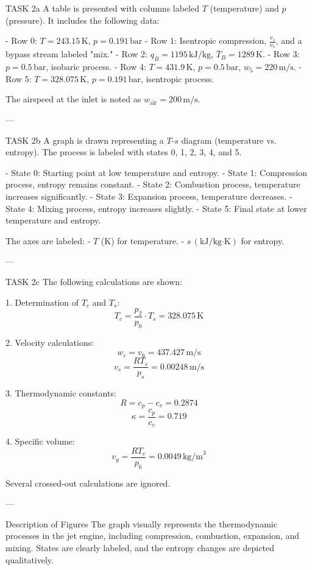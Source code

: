 TASK 2a  
A table is presented with columns labeled \( T \) (temperature) and \( p \) (pressure). It includes the following data:  

- Row 0: \( T = 243.15 \, \text{K} \), \( p = 0.191 \, \text{bar} \)  
- Row 1: Isentropic compression, \( \frac{v_1}{v_5} \), and a bypass stream labeled "mix."  
- Row 2: \( q_B = 1195 \, \text{kJ/kg} \), \( \bar{T}_B = 1289 \, \text{K} \).  
- Row 3: \( p = 0.5 \, \text{bar} \), isobaric process.  
- Row 4: \( T = 431.9 \, \text{K} \), \( p = 0.5 \, \text{bar} \), \( w_5 = 220 \, \text{m/s} \).  
- Row 5: \( T = 328.075 \, \text{K} \), \( p = 0.191 \, \text{bar} \), isentropic process.  

The airspeed at the inlet is noted as \( w_{\text{air}} = 200 \, \text{m/s} \).  

---

TASK 2b  
A graph is drawn representing a \( T \)-\( s \) diagram (temperature vs. entropy). The process is labeled with states 0, 1, 2, 3, 4, and 5.  

- State 0: Starting point at low temperature and entropy.  
- State 1: Compression process, entropy remains constant.  
- State 2: Combustion process, temperature increases significantly.  
- State 3: Expansion process, temperature decreases.  
- State 4: Mixing process, entropy increases slightly.  
- State 5: Final state at lower temperature and entropy.  

The axes are labeled:  
- \( T \) (K) for temperature.  
- \( s \, (\text{kJ}/\text{kg·K}) \) for entropy.  

---

TASK 2c  
The following calculations are shown:  

1. Determination of \( T_c \) and \( T_s \):  
\[
T_c = \frac{p_2}{p_0} \cdot T_s = 328.075 \, \text{K}
\]

2. Velocity calculations:  
\[
w_c = v_6 = 437.427 \, \text{m/s}
\]
\[
v_s = \frac{R T_s}{p_s} = 0.00248 \, \text{m/s}
\]

3. Thermodynamic constants:  
\[
R = c_p - c_v = 0.2874
\]
\[
\kappa = \frac{c_p}{c_v} = 0.719
\]

4. Specific volume:  
\[
v_g = \frac{R T_c}{p_6} = 0.0049 \, \text{kg/m}^3
\]  

Several crossed-out calculations are ignored.  

---

Description of Figures  
The graph visually represents the thermodynamic processes in the jet engine, including compression, combustion, expansion, and mixing. States are clearly labeled, and the entropy changes are depicted qualitatively.  

